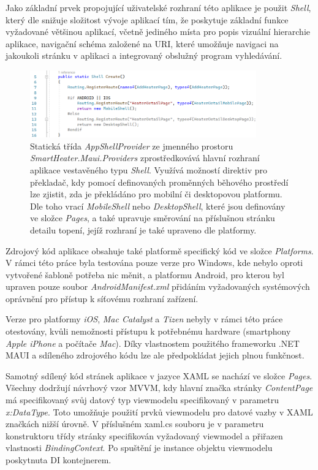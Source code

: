 Jako základní prvek propojující uživatelské rozhraní této aplikace je použit {\it Shell}, který dle \cite{maui-shell} snižuje složitost vývoje aplikací tím, že poskytuje základní funkce vyžadované většinou aplikací, včetně jediného místa pro popis vizuální hierarchie aplikace, navigační schéma založené na URI, které umožňuje navigaci na jakoukoli stránku v aplikaci a integrovaný obslužný program vyhledávání.

\begin{figure}[hbt]
\label{appshellprovider}
\includegraphics[width=0.87\textwidth]{obrazky-figures/code-maui-appshellprovider.png}
\caption{Statická třída {\it AppShellProvider} ze jmenného prostoru {\it SmartHeater.Maui.Providers} zprostředkovává hlavní rozhraní aplikace vestavěného typu {\it Shell}. Využívá možností direktiv pro překladač, kdy pomocí definovaných proměnných běhového prostředí lze zjistit, zda je překládáno pro mobilní či desktopovou platformu. Dle toho vrací {\it MobileShell} nebo {\it DesktopShell}, které jsou definovány ve složce {\it Pages}, a také upravuje směrování na příslušnou stránku detailu topení, jejíž rozhraní je také upraveno dle platformy.}
\end{figure}

Zdrojový kód aplikace obsahuje také platformě specifický kód ve složce {\it Platforms}. V rámci této práce byla testována pouze verze pro Windows, kde nebylo oproti vytvořené šabloně potřeba nic měnit, a platformu Android, pro kterou byl upraven pouze soubor {\it AndroidManifest.xml} přidáním vyžadovaných systémových oprávnění pro přístup k síťovému rozhraní zařízení.

Verze pro platformy {\it iOS}, {\it Mac Catalyst} a {\it Tizen} nebyly v rámci této práce otestovány, kvůli nemožnosti přístupu k potřebnému hardware (smartphony {\it Apple iPhone} a počítače {\it Mac}). Díky vlastnostem použitého frameworku .NET MAUI a sdíleného zdrojového kódu lze ale předpokládat jejich plnou funkčnost.

Samotný sdílený kód stránek aplikace v jazyce XAML se nachází ve složce {\it Pages}. Všechny dodržují návrhový vzor MVVM, kdy hlavní značka stránky {\it ContentPage} má specifikovaný svůj datový typ viewmodelu specifikovaný v parametru {\it x:DataType}. Toto umožňuje použití prvků viewmodelu pro datové vazby v XAML značkách nižší úrovně. V příslušném xaml.cs souboru je v parametru konstruktoru třídy stránky specifikován vyžadovaný viewmodel a přiřazen vlastnosti {\it BindingContext}. Po spuštění je instance objektu viewmodelu poskytnuta DI kontejnerem.

